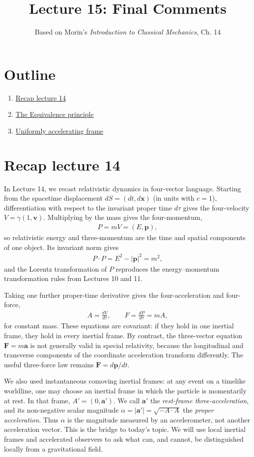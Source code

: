 \documentclass[12pt]{article}
\title{\textbf{Lecture 15: Final Comments}}
\author{Based on Morin's \textit{Introduction to Classical Mechanics}, Ch. 14}
\date{}
\newcommand{\be}{\begin{eqnarray}}
\newcommand{\ee}{\end{eqnarray}}
\begin{document}
\maketitle

\section*{Outline}
\begin{enumerate}
    \item \href{sec:recap}{Recap lecture 14}
    \item \href{sec:EP}{The Equivalence principle}
    \item \href{sec:UAF}{Uniformly accelerating frame}
\end{enumerate}

\section{Recap lecture 14}\label{sec:recap}
In Lecture 14, we recast relativistic dynamics in four-vector language. Starting from the spacetime displacement $dS=(dt,d\mathbf{x})$ (in units with $c=1$), differentiation with respect to the invariant proper time $d\tau$ gives the four-velocity $V=\gamma(1,\mathbf v)$. Multiplying by the mass gives the four-momentum,
\be
P=mV=(E,\mathbf p),
\ee
so relativistic energy and three-momentum are the time and spatial components of one object.  Its invariant norm gives
\be
P\cdot P=E^2-|\mathbf p|^2=m^2,
\ee
and the Lorentz transformation of $P$ reproduces the energy--momentum transformation rules from Lectures 10 and 11.

Taking one further proper-time derivative gives the four-acceleration and four-force,
\be
A=\frac{dV}{d\tau},\qquad
F=\frac{dP}{d\tau}=mA,
\ee
for constant mass.  These equations are covariant: if they hold in one inertial frame, they hold in every inertial frame.  By contrast, the three-vector equation $\mathbf F=m\mathbf a$ is not generally valid in special relativity, because the longitudinal and transverse components of the coordinate acceleration transform differently.  The useful three-force law remains $\mathbf F=d\mathbf p/dt$.

We also used instantaneous comoving inertial frames: at any event on a timelike worldline, one may choose an inertial frame in which the particle is momentarily at rest. In that frame, $A'=(0,\mathbf a')$. We call $\mathbf a'$ the \emph{rest-frame three-acceleration}, and its non-negative scalar magnitude $\alpha=|\mathbf a'|=\sqrt{-A\cdot A}$ the \emph{proper acceleration}. Thus $\alpha$ is the magnitude measured by an accelerometer, not another acceleration vector. This is the bridge to today's topic. We will use local inertial frames and accelerated observers to ask what can, and cannot, be distinguished locally from a gravitational field.
\end{document}
